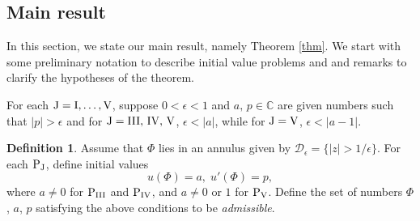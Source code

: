 \documentclass[a4paper,reqno]{amsart}
\theoremstyle{definition}
\newtheorem{definition}{Definition}[section]
\theoremstyle{remark}
\theoremstyle{theorem}
\numberwithin{equation}{section}
\begin{document}
\subsection{Main result}\label{s:main}
 In this section, we state our main result, namely Theorem \ref{thm}. We start with some preliminary notation to describe initial value problems and and remarks to clarify the hypotheses of the theorem.  
  
For each $\rm J=\rm I,\ldots, \rm V$, suppose $0<\epsilon<1$ and $a, \,p\in\mathbb C$ are given numbers such that $|p|>\epsilon$ and for $\rm J={\rm III},\, {\rm IV},\, \rm V$, $\epsilon<|a|$, while for $\rm J=\rm V$, $\epsilon<|a-1|$. 

\begin{definition}\label{def11}
Assume that $\Phi$ lies in an annulus given by $\mathcal D_\epsilon=\{|z|>1/\epsilon\}$. For each ${\rm P}_{\rm J}$, define initial values
\[
u(\Phi)=a, \; u'(\Phi)=p,
\]
where $a\neq 0$ for $\text{P$_{\text{III}}$}$ and $\text{P$_{\text{IV}}$}$, and $a\neq 0$ or $1$ for $\text{P$_{\text{V}}$}$.  Define the set of numbers $\Phi$, $a$, $p$ satisfying the above conditions to be {\em admissible}.
\end{definition}
\end{document}
